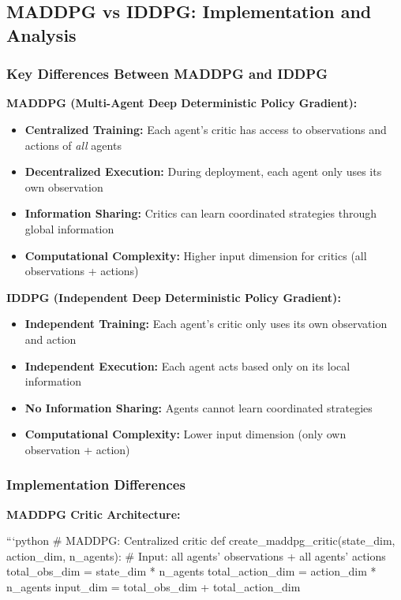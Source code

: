 \documentclass[12pt]{article}
\begin{document}
{{{{{{\subsection{MADDPG vs IDDPG: Implementation and Analysis}

\subsubsection{Key Differences Between MADDPG and IDDPG}

\textbf{MADDPG (Multi-Agent Deep Deterministic Policy Gradient):}

\begin{itemize}
    \item \textbf{Centralized Training:} Each agent's critic has access to observations and actions of \textit{all} agents
    \item \textbf{Decentralized Execution:} During deployment, each agent only uses its own observation
    \item \textbf{Information Sharing:} Critics can learn coordinated strategies through global information
    \item \textbf{Computational Complexity:} Higher input dimension for critics (all observations + actions)
\end{itemize}

\textbf{IDDPG (Independent Deep Deterministic Policy Gradient):}

\begin{itemize}
    \item \textbf{Independent Training:} Each agent's critic only uses its own observation and action
    \item \textbf{Independent Execution:} Each agent acts based only on its local information
    \item \textbf{No Information Sharing:} Agents cannot learn coordinated strategies
    \item \textbf{Computational Complexity:} Lower input dimension (only own observation + action)
\end{itemize}

\subsubsection{Implementation Differences}

\textbf{MADDPG Critic Architecture:}

```python
# MADDPG: Centralized critic
def create_maddpg_critic(state_dim, action_dim, n_agents):
    # Input: all agents' observations + all agents' actions
    total_obs_dim = state_dim * n_agents
    total_action_dim = action_dim * n_agents
    input_dim = total_obs_dim + total_action_dim
    
}}}}}}
\end{document}
